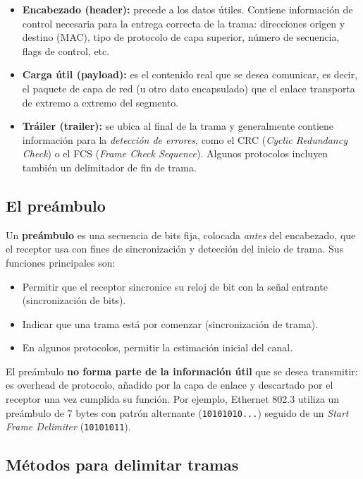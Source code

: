 \documentclass[12pt,a4paper]{article}
\begin{document}
\begin{itemize}
  \item \textbf{Encabezado (header):} precede a los datos útiles. Contiene información de control necesaria para la entrega correcta de la trama: direcciones origen y destino (MAC), tipo de protocolo de capa superior, número de secuencia, flags de control, etc.
  \item \textbf{Carga útil (payload):} es el contenido real que se desea comunicar, es decir, el paquete de capa de red (u otro dato encapsulado) que el enlace transporta de extremo a extremo del segmento.
  \item \textbf{Tráiler (trailer):} se ubica al final de la trama y generalmente contiene información para la \emph{detección de errores}, como el CRC (\emph{Cyclic Redundancy Check}) o el FCS (\emph{Frame Check Sequence}). Algunos protocolos incluyen también un delimitador de fin de trama.
\end{itemize}

\subsection{El preámbulo}

Un \textbf{preámbulo} es una secuencia de bits fija, colocada \emph{antes} del encabezado, que el receptor usa con fines de sincronización y detección del inicio de trama. Sus funciones principales son:

\begin{itemize}
  \item Permitir que el receptor sincronice su reloj de bit con la señal entrante (sincronización de bits).
  \item Indicar que una trama está por comenzar (sincronización de trama).
  \item En algunos protocolos, permitir la estimación inicial del canal.
\end{itemize}

El preámbulo \textbf{no forma parte de la información útil} que se desea transmitir: es overhead de protocolo, añadido por la capa de enlace y descartado por el receptor una vez cumplida su función. Por ejemplo, Ethernet 802.3 utiliza un preámbulo de 7 bytes con patrón alternante (\texttt{10101010...}) seguido de un \emph{Start Frame Delimiter} (\texttt{10101011}).

\subsection{Métodos para delimitar tramas}
\end{document}
